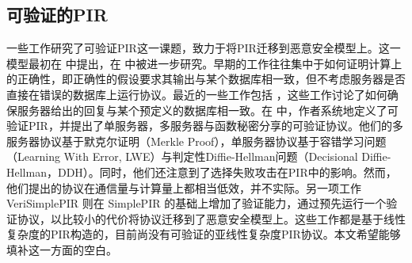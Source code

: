\subsection{可验证的PIR}
一些工作研究了可验证PIR这一课题，致力于将PIR迁移到恶意安全模型上。这一模型最初在 \cite{FOCS:CGKS95} 中提出，在 \cite{SCN:BeiSta02, USENIX:DevGolHen12,SVPIR18, MerkleTree} 中被进一步研究。早期的工作往往集中于如何证明计算上的正确性，即正确性的假设要求其输出与某个数据库相一致，但不考虑服务器是否直接在错误的数据库上运行协议。最近的一些工作包括 \cite{VeriSimplePIR, APIR}，这些工作讨论了如何确保服务器给出的回复与某个预定义的数据库相一致。在 \cite{APIR} 中，作者系统地定义了可验证PIR，并提出了单服务器，多服务器与函数秘密分享的可验证协议。他们的多服务器协议基于默克尔证明（Merkle Proof），单服务器协议基于容错学习问题（Learning With Error, LWE）与判定性Diffie-Hellman问题（Decisional Diffie-Hellman，DDH）。同时，他们还注意到了选择失败攻击在PIR中的影响。然而，他们提出的协议在通信量与计算量上都相当低效，并不实际。另一项工作 VeriSimplePIR \cite{VeriSimplePIR} 则在 SimplePIR 的基础上增加了验证能力，通过预先运行一个验证协议，以比较小的代价将协议迁移到了恶意安全模型上。这些工作都是基于线性复杂度的PIR构造的，目前尚没有可验证的亚线性复杂度PIR协议。本文希望能够填补这一方面的空白。


